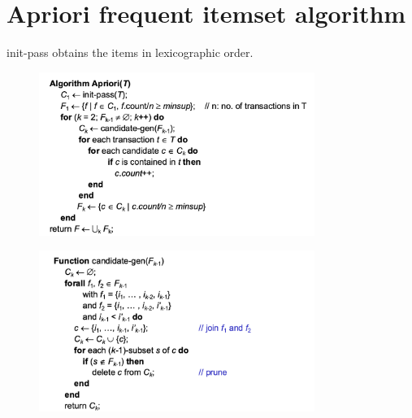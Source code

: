 \documentclass[10pt,oneside,a4paper]{article}
\begin{document}
\section{Apriori frequent itemset algorithm}
init-pass obtains the items in lexicographic order.
\begin{figure}[H]
    \centering
    \includegraphics[width=0.8\textwidth]{Images/Apriori.png}
\end{figure}
\begin{figure}[H]
    \centering
    \includegraphics[width=0.8\textwidth]{Images/Candidate_gen_apriori.png}
\end{figure}
\end{document}
